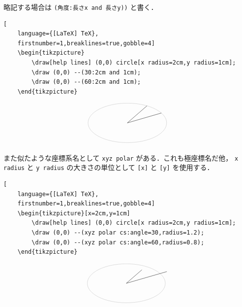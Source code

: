 \documentclass[lualatex]{jlreq}
\begin{document}
略記する場合は \verb|(角度:長さx and 長さy))| と書く．
\begin{lstlisting}[
    language={[LaTeX] TeX},
    firstnumber=1,breaklines=true,gobble=4]
    \begin{tikzpicture}
        \draw[help lines] (0,0) circle[x radius=2cm,y radius=1cm];
        \draw (0,0) --(30:2cm and 1cm);
        \draw (0,0) --(60:2cm and 1cm);
    \end{tikzpicture}
\end{lstlisting}
\[
    \begin{tikzpicture}
        \draw[help lines] (0,0) circle[x radius=2cm,y radius=1cm];
        \draw (0,0) --(30:2cm and 1cm);
        \draw (0,0) --(60:2cm and 1cm);
    \end{tikzpicture}
\]

また似たような座標系名として \verb|xyz polar| がある．これも極座標名だ他， \verb|x radius| と \verb|y radius| の大きさの単位として \verb|[x]| と \verb|[y]| を使用する．
\begin{lstlisting}[
    language={[LaTeX] TeX},
    firstnumber=1,breaklines=true,gobble=4]
    \begin{tikzpicture}[x=2cm,y=1cm]
        \draw[help lines] (0,0) circle[x radius=2cm,y radius=1cm];
        \draw (0,0) --(xyz polar cs:angle=30,radius=1.2);
        \draw (0,0) --(xyz polar cs:angle=60,radius=0.8);
    \end{tikzpicture}
\end{lstlisting}
\[
    \begin{tikzpicture}[x=2cm,y=1cm]
        \draw[help lines] (0,0) circle[x radius=2cm,y radius=1cm];
        \draw (0,0) --(xyz polar cs:angle=30,radius=1.2);
        \draw (0,0) --(xyz polar cs:angle=60,radius=0.8);
    \end{tikzpicture}
\]
\end{document}
